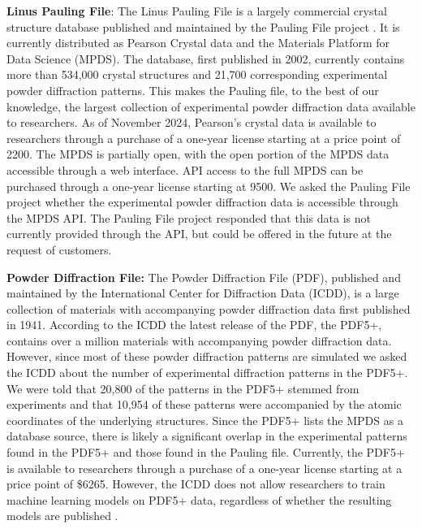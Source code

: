 \textbf{Linus Pauling File}:\cite{PaulingWeb} The Linus Pauling File is a largely commercial crystal structure database published and maintained by the Pauling File project \cite{villars2018}. It is currently distributed as Pearson Crystal data \cite{PearsonWeb} and the Materials Platform for Data Science (MPDS)\cite{MPDSWeb}. The database, first published in 2002, currently contains more than 534,000 crystal structures\cite{MPDSWeb} and 21,700 corresponding experimental powder diffraction patterns\cite{PearsonWeb}. 
This makes the Pauling file, to the best of our knowledge, the largest collection of experimental powder diffraction data available to researchers. As of November 2024, Pearson's crystal data is available to researchers through a purchase of a one-year license starting at a price point of \qty{2200}{\myeuro}\cite{PearsonBuy}. The MPDS is partially open, with the open portion of the MPDS data accessible through a web interface\cite{MPDSWeb}. API access to the full MPDS can be purchased through a one-year license starting at \qty{9500}{\myeuro}\cite{MPDSBuy}. We asked the Pauling File project whether the experimental powder diffraction data is accessible through the MPDS API. The Pauling File project responded that this data is not currently provided through the API, but could be offered in the future at the request of customers.

\textbf{Powder Diffraction File:} \cite{PDFWeb} The Powder Diffraction File (PDF), published and maintained by the International Center for Diffraction Data (ICDD), is a large collection of materials with accompanying powder diffraction data first published in 1941\cite{GatesRector2019}. According to the ICDD the latest release of the PDF, the PDF5+, contains over a million materials with accompanying powder diffraction data. However, since most of these powder diffraction patterns are simulated we asked the ICDD about the number of experimental diffraction patterns in the PDF5+. We were told that 20,800 of the patterns in the PDF5+ stemmed from experiments and that 10,954 of these patterns were accompanied by the atomic coordinates of the underlying structures. Since the PDF5+ lists the MPDS as a database source, there is likely a significant overlap in the experimental patterns found in the PDF5+ and those found in the Pauling file. Currently, the PDF5+ is available to researchers through a purchase of a one-year license starting at a price point of \$6265. However, the ICDD does not allow researchers to train machine learning models on PDF5+ data, regardless of whether the resulting models are published \cite{PDFLicenseWeb}.

